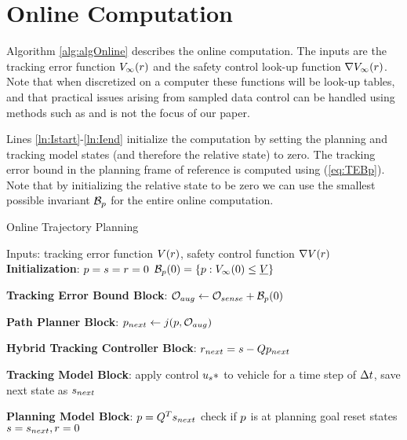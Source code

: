 \section{Online Computation \label{sec:online}}

Algorithm \ref{alg:algOnline} describes the online computation. The inputs are the tracking error function $V_\infty(r)$ and the safety control look-up function $\nabla V_\infty(r)$. Note that when discretized on a computer these functions will be look-up tables, and that practical issues arising from sampled data control can be handled using methods such as \cite{Mitchell2012, Mitchell13, Dabadie2014} and is not the focus of our paper.

Lines \ref{ln:Istart}-\ref{ln:Iend} initialize the computation by setting the planning and tracking model states (and therefore the relative state) to zero. The tracking error bound in the planning frame of reference is computed using (\ref{eq:TEBp}). Note that by initializing the relative state to be zero we can use the smallest possible invariant $\mathcal B_p$ for the entire online computation. 
\begin{algorithm}	
	\caption{Online Trajectory Planning}
	\label{alg:algOnline}
	\begin{algorithmic}[1]
		\STATE Inputs: tracking error function $V(r)$, safety control function $\nabla V(r)$
		\STATE \textbf{Initialization}: \label{ln:Istart}
		\STATE $p = s = r = 0$
		\STATE $\mathcal B_p(0) = \{p: V_\infty(0) \le \underline{V}\}$ \label{ln:Iend}
		
		\STATE \textbf{Tracking Error Bound Block}: \label{ln:obsStart}
		\STATE $\mathcal{O}_{aug} \leftarrow \mathcal{O}_{sense} + \mathcal B_p(0)$ \label{ln:obsEnd}
		
		\STATE \textbf{Path Planner Block}:\label{ln:plannerStart}
		\STATE $p_{next} \leftarrow j(p, \mathcal{O}_{aug})$\label{ln:plannerEnd}
		
		\STATE \textbf{Hybrid Tracking Controller Block}:\label{ln:controllerStart}
		\STATE $r_{next} = s - Qp_{next}$
		
		\ELSE {} \ENDIF \label{ln:controllerEnd}
		
		\STATE \textbf{Tracking Model Block}: \label{ln:trackingStart}
		\STATE apply control $u_s*$ to vehicle for a time step of $\Delta t$, save next state as $s_{next}$ \label{ln:trackingEnd}
		
		\STATE \textbf{Planning Model Block}:\label{ln:planningStart}
		\STATE $p = Q^Ts_{next}$
		\STATE check if $p$ is at planning goal
		\STATE reset states $s = s_{next}, r = 0$ \label{ln:planningEnd}
		\ENDWHILE
	\end{algorithmic}
\end{algorithm}

